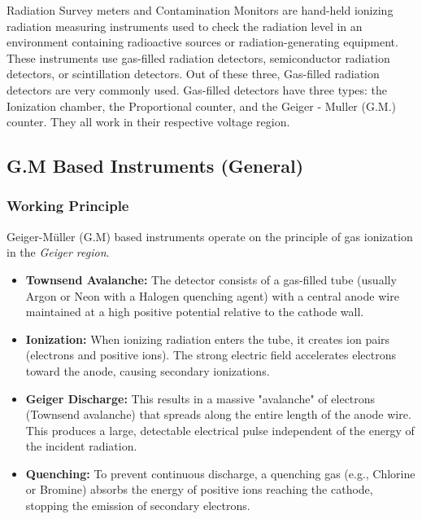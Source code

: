 Radiation Survey meters and Contamination Monitors are hand-held ionizing radiation measuring instruments used to check the radiation level in an environment containing radioactive
sources or radiation-generating equipment. These instruments use gas-filled radiation detectors,
semiconductor radiation detectors, or scintillation detectors. Out of these three, Gas-filled radiation
detectors are very commonly used. Gas-filled detectors have three types: the Ionization chamber, the
Proportional counter, and the Geiger - Muller (G.M.) counter. They all work in their respective voltage
region.
\subsection{G.M Based Instruments (General)}

\subsubsection{Working Principle}
Geiger-Müller (G.M) based instruments operate on the principle of gas ionization in the \textit{Geiger region}.
\begin{itemize}
    \item \textbf{Townsend Avalanche:} The detector consists of a gas-filled tube (usually Argon or Neon with a Halogen quenching agent) with a central anode wire maintained at a high positive potential relative to the cathode wall.
    \item \textbf{Ionization:} When ionizing radiation enters the tube, it creates ion pairs (electrons and positive ions). The strong electric field accelerates electrons toward the anode, causing secondary ionizations.
    \item \textbf{Geiger Discharge:} This results in a massive "avalanche" of electrons (Townsend avalanche) that spreads along the entire length of the anode wire. This produces a large, detectable electrical pulse independent of the energy of the incident radiation.
    \item \textbf{Quenching:} To prevent continuous discharge, a quenching gas (e.g., Chlorine or Bromine) absorbs the energy of positive ions reaching the cathode, stopping the emission of secondary electrons.
\end{itemize}

